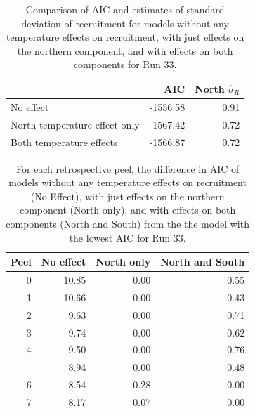 \documentclass[
]{article}
\begin{document}
\begin{table}

\caption{\label{tab:compare-table}Comparison of AIC and estimates of standard deviation of recruitment for models without any temperature effects on recruitment, with just effects on the northern component, and with effects on both components for Run 33.}
\centering
\begin{tabular}[t]{lrr}
\toprule
  & AIC & North $\widehat{\sigma}_R$\\
\midrule
No effect & -1556.58 & 0.91\\
North temperature effect only & -1567.42 & 0.72\\
Both temperature effects & -1566.87 & 0.72\\
\bottomrule
\end{tabular}
\end{table}
\begin{table}

\caption{\label{tab:peel-compare-table}For each retrospective peel, the difference in AIC of models without any temperature effects on recruitment (No Effect), with just effects on the northern component (North only), and with effects on both components (North and South) from the the model with the lowest AIC for Run 33.}
\centering
\begin{tabular}[t]{rrrr}
\toprule
Peel & No effect & North only & North and South\\
\midrule
0 & 10.85 & 0.00 & 0.55\\
1 & 10.66 & 0.00 & 0.43\\
2 & 9.63 & 0.00 & 0.71\\
3 & 9.74 & 0.00 & 0.62\\
4 & 9.50 & 0.00 & 0.76\\
\addlinespace
5 & 8.94 & 0.00 & 0.48\\
6 & 8.54 & 0.28 & 0.00\\
7 & 8.17 & 0.07 & 0.00\\
\bottomrule
\end{tabular}
\end{table}

\clearpage
\end{document}
